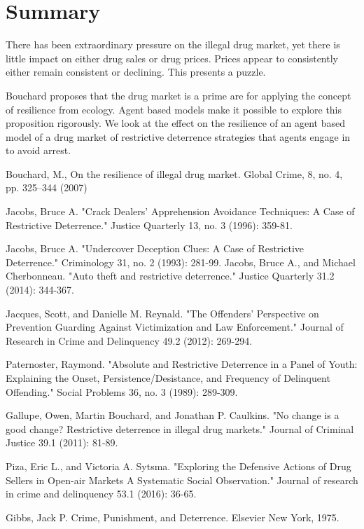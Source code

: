 \documentclass[runningheads,a4paper]{llncs}
\begin{document}
\section{Summary}

There has been extraordinary pressure on the illegal drug market, yet there is
little impact on either drug sales or drug prices. Prices appear to consistently either remain consistent or declining. This presents a puzzle. 

Bouchard proposes that the drug market is a prime are for applying the concept of resilience from ecology. Agent based models make it possible to explore this proposition rigorously. We look at the effect on the resilience of an agent based model of a drug market of restrictive deterrence strategies that agents engage in to avoid arrest.


\begin{thebibliography}{4}


 Bouchard, M., On the resilience of illegal drug market. Global Crime, 8, no. 4, pp. 325--344 (2007)

 Jacobs, Bruce A. "Crack Dealers' Apprehension Avoidance Techniques: A Case of Restrictive Deterrence." Justice Quarterly 13, no. 3 (1996): 359-81.

 Jacobs, Bruce A. "Undercover Deception Clues: A Case of Restrictive Deterrence." Criminology 31, no. 2 (1993): 281-99.
Jacobs, Bruce A., and Michael Cherbonneau. "Auto theft and restrictive deterrence." Justice Quarterly 31.2 (2014): 344-367.

 Jacques, Scott, and Danielle M. Reynald. "The Offenders’ Perspective on Prevention Guarding Against Victimization and Law Enforcement." Journal of Research in Crime and Delinquency 49.2 (2012): 269-294.

 Paternoster, Raymond. "Absolute and Restrictive Deterrence in a Panel of Youth: Explaining the Onset, Persistence/Desistance, and Frequency of Delinquent Offending." Social Problems 36, no. 3 (1989): 289-309.

 Gallupe, Owen, Martin Bouchard, and Jonathan P. Caulkins. "No change is a good change? Restrictive deterrence in illegal drug markets." Journal of Criminal Justice 39.1 (2011): 81-89.

 Piza, Eric L., and Victoria A. Sytsma. "Exploring the Defensive Actions of Drug Sellers in Open-air Markets A Systematic Social Observation." Journal of research in crime and delinquency 53.1 (2016): 36-65.

 Gibbs, Jack P. Crime, Punishment, and Deterrence. Elsevier New York, 1975.

\end{thebibliography}
\end{document}
